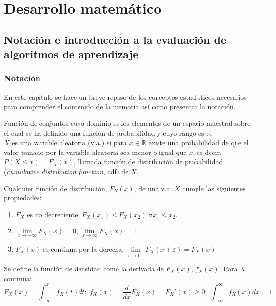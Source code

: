 \part{Desarrollo matemático}
\label{part:matematicas}

\chapter{Notación e introducción a la evaluación de algoritmos de aprendizaje}
\label{chapter:notacion}

\section*{Notación}

	En este capítulo se hace un breve repaso de los 
conceptos estadísticos necesarios para comprender el 
contenido de la memoria así como presentar la notación.
	
\begin{definicion}
	Función de conjuntos cuyo dominio es los elementos de un 
espacio muestral sobre el cual se ha definido una función de
probabilidad y cuyo rango es $\mathbb{R}$.\\
	$X$ es una variable aleatoria (v.a.) si para $x \in 
\mathbb{R}$ existe una probabilidad de que el valor tomado 
por la variable aleatoria sea menor o igual que $x$, es
decir, $P(X \leq x) = F_X (x)$, llamada función de
distribución de probabilidad (\textit{cumulative distribution
function}, cdf) de $X$.	
\end{definicion}

	Cualquier función de distribución, $F_X(x)$, de una v.a.
$X$ cumple las siguientes propiedades:
 
\begin{enumerate}
	\item $F_X$ es no decreciente: 
			$F_X(x_1) \leq F_X(x_2) \ \forall x_1 \leq x_2$.
	\item $\underset{x \rightarrow -\infty}{\lim} F_X(x) =
			 0$,
			$\underset{x \rightarrow \infty}{\lim} F_X(x) =
			 1$
	\item $F_X(x)$ es continua por la derecha: 
		$\underset{\varepsilon \rightarrow 0^+}{\lim} 
		F_X(x+\varepsilon) = F_X(x)$
\end{enumerate}
	
\begin{definicion}
	Se define la función de densidad como la derivada de 
$F_X(x)$, $f_X(x)$. Para $X$ continua:
	\[ 
		F_X(x) = \int_{-\infty}^x f_X(t) dt; \;
		f_X(x) = \frac{d}{dx}F_X(x) = F_X'(x) \geq 0; \;
		\int_{-\infty}^{\infty} f_X(x) dx = 1 
	\]
\end{definicion}
	
